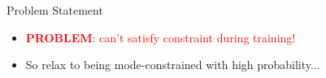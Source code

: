 \documentclass[final,12pt]{beamer}
\newlength{\colwidth}
\newcommand{\E}{\mathbb{E}}    %
\renewcommand{\mid}{\,|\,}
\DeclareMathOperator{\E}{\mathbb{E}}
\newcommand{\modeInd}{\ensuremath{k}}
\newcommand{\ModeInd}{\ensuremath{\MakeUppercase{\modeInd}}}
\newcommand{\mode}[1]{\ensuremath{#1_{\modeInd}}}
\newcommand{\state}{\ensuremath{\mathbf{x}}}
\newcommand{\control}{\ensuremath{\mathbf{u}}}
\newcommand{\modeVar}{\ensuremath{\alpha}}
\newcommand{\timeInd}{\ensuremath{t}}
\newcommand{\TimeInd}{\ensuremath{\MakeUppercase{\timeInd}}}
\newcommand{\dynamicsFunc}{\ensuremath{f}}
\newcommand{\desiredMode}{\ensuremath{\modeInd^{*}}}
\newcommand{\stateDomain}{\ensuremath{\mathcal{S}}}
\newcommand{\controlDomain}{\ensuremath{\mathcal{A}}}
\renewcommand{\state}{\ensuremath{\mathbf{s}}}
\renewcommand{\mode}[1]{\ensuremath{#1_{\modeInd}}}
\renewcommand{\control}{\ensuremath{\mathbf{a}}}
\newcommand{\rewardFunc}{\ensuremath{r}}
\begin{document}
\begin{frame}[t]
\begin{columns}[t]
\begin{column}{\colwidth}
\begin{block}{Problem Statement}
\begin{itemize}
        \begin{align} \label{eq-main-problem}
        \pi^{*}=\arg \max_{\pi \in \Pi} J(\pi, \dynamicsFunc) \quad \text{s.t. } &\color{black}{\underbrace{\modeVar(\state_{\timeInd}) = \desiredMode \quad \forall \timeInd \in \{0, \ldots, \TimeInd\}}_{\text{mode constraint}}},
        \end{align}
      whilst remaining in the desired dynamic mode's $\desiredMode$ state domain $\stateDomain_{\desiredMode} = \{ \state \in \stateDomain \mid \modeVar(\state) = \desiredMode\}$.
      \item \textcolor{red}{\textbf{PROBLEM}: can't satisfy constraint during training!}
      \item So relax to being mode-constrained with high probability...
    \end{itemize}




\end{block}
\end{column}
\end{columns}
\end{frame}
\end{document}
